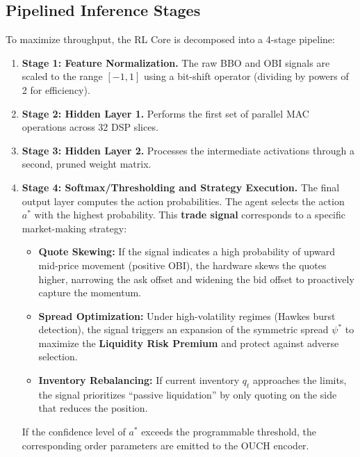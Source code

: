 \subsection{Pipelined Inference Stages}
To maximize throughput, the RL Core is decomposed into a 4-stage pipeline:
\begin{enumerate}
    \item \textbf{Stage 1: Feature Normalization.} The raw BBO and OBI signals are scaled to the range $[-1, 1]$ using a bit-shift operator (dividing by powers of 2 for efficiency).
    \item \textbf{Stage 2: Hidden Layer 1.} Performs the first set of parallel MAC operations across 32 DSP slices.
    \item \textbf{Stage 3: Hidden Layer 2.} Processes the intermediate activations through a second, pruned weight matrix.
    \item \textbf{Stage 4: Softmax/Thresholding and Strategy Execution.} The final output layer computes the action probabilities. The agent selects the action $a^*$ with the highest probability. This \textbf{trade signal} corresponds to a specific market-making strategy:
    \begin{itemize}
        \item \textbf{Quote Skewing:} If the signal indicates a high probability of upward mid-price movement (positive OBI), the hardware skews the quotes higher, narrowing the ask offset and widening the bid offset to proactively capture the momentum.
        \item \textbf{Spread Optimization:} Under high-volatility regimes (Hawkes burst detection), the signal triggers an expansion of the symmetric spread $\psi^*$ to maximize the \textbf{Liquidity Risk Premium} and protect against adverse selection.
        \item \textbf{Inventory Rebalancing:} If current inventory $q_t$ approaches the limits, the signal prioritizes ``passive liquidation'' by only quoting on the side that reduces the position.
    \end{itemize}
    If the confidence level of $a^*$ exceeds the programmable threshold, the corresponding order parameters are emitted to the OUCH encoder.

\end{enumerate}

